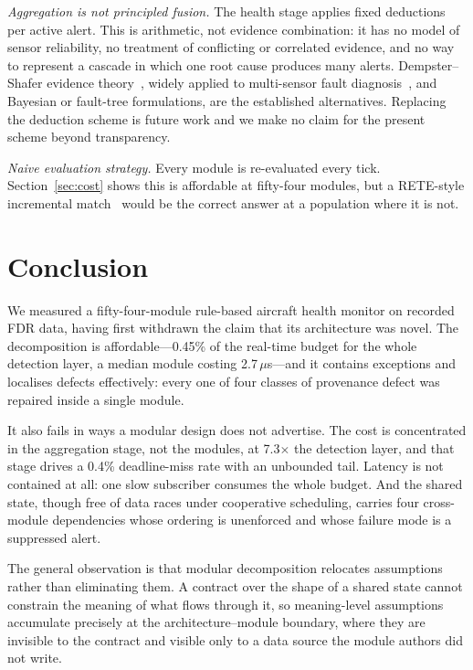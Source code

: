 \documentclass[conference]{IEEEtran}
\begin{document}
\textit{Aggregation is not principled fusion.} The health stage applies fixed
deductions per active alert. This is arithmetic, not evidence combination: it
has no model of sensor reliability, no treatment of conflicting or correlated
evidence, and no way to represent a cascade in which one root cause produces
many alerts. Dempster--Shafer evidence theory~\cite{shafer1976}, widely applied
to multi-sensor fault diagnosis~\cite{ds_survey2022}, and Bayesian or
fault-tree formulations, are the established alternatives. Replacing the
deduction scheme is future work and we make no claim for the present scheme
beyond transparency.

\textit{Naive evaluation strategy.} Every module is re-evaluated every tick.
Section~\ref{sec:cost} shows this is affordable at fifty-four modules, but a
RETE-style incremental match~\cite{forgy1982} would be the correct answer at a
population where it is not.

\section{Conclusion}

We measured a fifty-four-module rule-based aircraft health monitor on recorded
FDR data, having first withdrawn the claim that its architecture was novel. The
decomposition is affordable---0.45\% of the real-time budget for the whole
detection layer, a median module costing 2.7\,$\mu$s---and it contains
exceptions and localises defects effectively: every one of four classes of
provenance defect was repaired inside a single module.

It also fails in ways a modular design does not advertise. The cost is
concentrated in the aggregation stage, not the modules, at 7.3$\times$ the
detection layer, and that stage drives a 0.4\% deadline-miss rate with an
unbounded tail. Latency is not contained at all: one slow subscriber consumes
the whole budget. And the shared state, though free of data races under
cooperative scheduling, carries four cross-module dependencies whose ordering
is unenforced and whose failure mode is a suppressed alert.

The general observation is that modular decomposition relocates assumptions
rather than eliminating them. A contract over the shape of a shared state
cannot constrain the meaning of what flows through it, so meaning-level
assumptions accumulate precisely at the architecture--module boundary, where
they are invisible to the contract and visible only to a data source the module
authors did not write.
\end{document}
